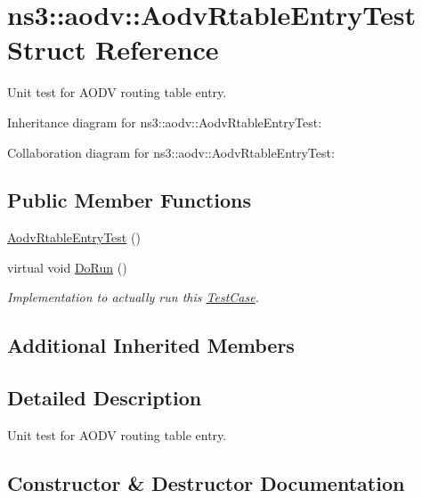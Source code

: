 \hypertarget{structns3_1_1aodv_1_1AodvRtableEntryTest}{}\section{ns3\+:\+:aodv\+:\+:Aodv\+Rtable\+Entry\+Test Struct Reference}
\label{structns3_1_1aodv_1_1AodvRtableEntryTest}


Unit test for A\+O\+DV routing table entry.  




Inheritance diagram for ns3\+:\+:aodv\+:\+:Aodv\+Rtable\+Entry\+Test\+:


Collaboration diagram for ns3\+:\+:aodv\+:\+:Aodv\+Rtable\+Entry\+Test\+:
\subsection*{Public Member Functions}
\begin{DoxyCompactItemize}
\item 
\hyperlink{structns3_1_1aodv_1_1AodvRtableEntryTest_a066aef8e239506b682be1d4a686b1b91}{Aodv\+Rtable\+Entry\+Test} ()
\item 
virtual void \hyperlink{structns3_1_1aodv_1_1AodvRtableEntryTest_ad1739d41fc9618c26b8c43e9ad45a60b}{Do\+Run} ()
\begin{DoxyCompactList}\small\item\em Implementation to actually run this \hyperlink{classns3_1_1TestCase}{Test\+Case}. \end{DoxyCompactList}\end{DoxyCompactItemize}
\subsection*{Additional Inherited Members}


\subsection{Detailed Description}
Unit test for A\+O\+DV routing table entry. 

\subsection{Constructor \& Destructor Documentation}
